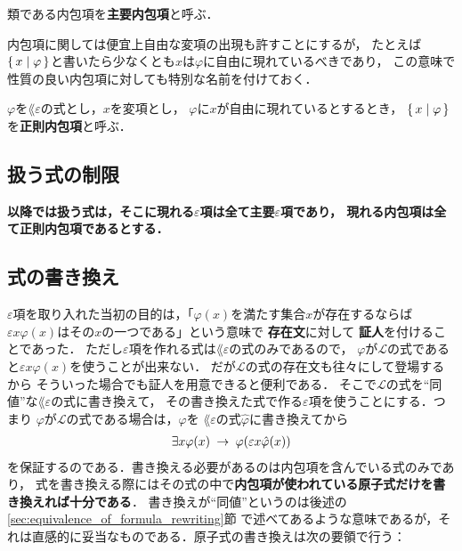 	\begin{screen}
		\begin{dfn}[主要内包項]
			類である内包項を{\bf 主要内包項}と呼ぶ．
		\end{dfn}
	\end{screen}
	
	内包項に関しては便宜上自由な変項の出現も許すことにするが，
	たとえば$\left\{\, x \mid \varphi\, \right\}$と書いたら少なくとも$x$は$\varphi$に自由に現れているべきであり，
	この意味で性質の良い内包項に対しても特別な名前を付けておく．
	
	\begin{screen}
		\begin{dfn}[正則内包項]
			$\varphi$を$\lang{\varepsilon}$の式とし，$x$を変項とし，
			$\varphi$に$x$が自由に現れているとするとき，
			$\left\{\, x \mid \varphi\, \right\}$を{\bf 正則内包項}\index{せいそくないほうこう@正則内包項}と呼ぶ．
		\end{dfn}
	\end{screen}
	
\subsection{扱う式の制限}
\label{sec:restriction_of_formulas}
	{\bf 以降では扱う式は，そこに現れる$\varepsilon$項は全て主要$\varepsilon$項であり，
	現れる内包項は全て正則内包項であるとする．}

\subsection{式の書き換え}
	$\varepsilon$項を取り入れた当初の目的は，「$\varphi(x)$を満たす集合$x$が存在するならば
	$\varepsilon x \varphi(x)$はその$x$の一つである」という意味で
	{\bf 存在文}に対して
	{\bf 証人}を付けることであった．
	ただし$\varepsilon$項を作れる式は$\lang{\varepsilon}$の式のみであるので，
	$\varphi$が$\mathcal{L}$の式であると$\varepsilon x \varphi(x)$を使うことが出来ない．
	だが$\mathcal{L}$の式の存在文も往々にして登場するから
	そういった場合でも証人を用意できると便利である．
	そこで$\mathcal{L}$の式を``同値''な$\lang{\varepsilon}$の式に書き換えて，
	その書き換えた式で作る$\varepsilon$項を使うことにする．つまり
	$\varphi$が$\mathcal{L}$の式である場合は，$\varphi$を
	$\lang{\varepsilon}$の式$\hat{\varphi}$に書き換えてから
	\begin{align}
		\exists x \varphi(x) \hspace{0.25em}\rightarrow\hspace{0.25em} \varphi(\varepsilon x \hat{\varphi}(x))
	\end{align}
	を保証するのである．書き換える必要があるのは内包項を含んでいる式のみであり，
	式を書き換える際にはその式の中で{\bf 内包項が使われている原子式だけを書き換えれば十分である}．
	書き換えが``同値''というのは後述の\ref{sec:equivalence_of_formula_rewriting}節
	で述べてあるような意味であるが，それは直感的に妥当なものである．原子式の書き換えは次の要領で行う：
	

